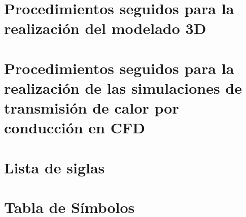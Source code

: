 \chapter[Procedimientos del modelado 3D]{Procedimientos seguidos para la realización del modelado 3D}\label{ch:procedimientosModelado3D}
\chapter[Procedimientos simulaciones conducci\'{o}n]{Procedimientos seguidos para la realización de las simulaciones de transmisión de calor por conducción en CFD}\label{ch:procedimientosSimCond}
\chapter{Lista de siglas}

\glsaddall
\setlength{\glsdescwidth}{\textwidth}
\printglossary[type=\acronymtype,title=Acr\'{o}nimos,style=longheader]%
\let\cleardoublepage\clearpage
\chapter{Tabla de Símbolos}
\setlength{\glsdescwidth}{15cm}
\printglossary[type=symbolslist,style=symbunitlong]
\let\cleardoublepage\clearpage
